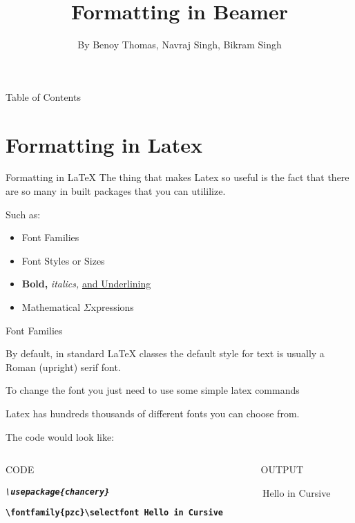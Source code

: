 \documentclass[pdf]{beamer}
\title{Formatting in Beamer}
\author[]{By Benoy Thomas, Navraj Singh, Bikram Singh}
\begin{document}
\maketitle
\begin{frame}{Table of Contents}
    \tableofcontents
\end{frame}
\section{Formatting in Latex}
\begin{frame}{Formatting in LaTeX}
    The thing that makes Latex so useful is the fact that
    there are so many in built packages that you can utililize.

    \par Such as:
    \begin{itemize}
        \item {\selectfont Font Families}
        \item \Huge{Font} \huge{Styles} \Large{or} \large{Sizes}
        \item \textbf{Bold,} \textit{italics,} \underline{ and Underlining}
        \item Mathematical $\Sigma$xpressions
    \end{itemize}

\end{frame}

\begin{frame}{Font Families}
    \par By default, in standard LaTeX classes the default style for text is usually a Roman (upright) serif font. 
    \par To change the font you just need to use some simple latex commands
    \par Latex has hundreds thousands of different fonts you can choose from.
    \par The code would look like:
    \begin{columns}
        \begin{column}{0.5\textwidth}
            \begin{center}
                CODE
            \end{center}
            \par \small{\textbf{\textit{\texttt{\textbackslash usepackage\{chancery\}}}}}
            \par \small{\textbf{\texttt{\textbackslash fontfamily\{pzc\}\textbackslash selectfont Hello in Cursive}}}
        \end{column}
        \vrule
        \begin{column}{0.5\textwidth}
            \begin{center}
                OUTPUT
            \end{center}
            \par \small{\selectfont \,Hello in Cursive\\~\\~\\}
        \end{column}
    \end{columns}
\end{frame}
\end{document}
